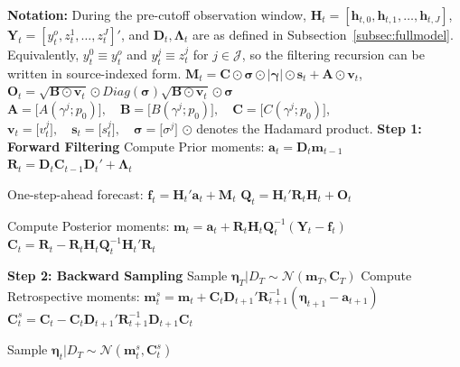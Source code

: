 \documentclass[APA,STIX1COL]{WileyNJD-v2}
\begin{document}
\begin{algorithm}
\caption{MCMC - Forward Filtering Backward Sampling (FFBS)}
\label{alg:Alg2}
\begin{algorithmic}

\State \textbf{Notation:}
\State  During the pre-cutoff observation window, \(\mathbf{H}_t = [\mathbf{h}_{t,0}, \mathbf{h}_{t,1}, \ldots, \mathbf{h}_{t,J}]\), \(\mathbf{Y}_t = [y_t^o, z_t^1, \ldots, z_t^J]'\), and \(\mathbf{D}_t, \boldsymbol{\Lambda}_t\) are as defined in Subsection~\ref{subsec:fullmodel}.
\State  Equivalently, \(y_t^0 \equiv y_t^o\) and \(y_t^j \equiv z_t^j\) for \(j\in\mathcal{J}\), so the filtering recursion can be written in source-indexed form.
\State $\mathbf{M}_t= \mathbf{C} \odot  \mathbf{\sigma} \odot | \mathbf{\gamma} | \odot \mathbf{s}_t + \mathbf{A} \odot \mathbf{v}_t$, \quad $\mathbf{O}_t= \sqrt{\mathbf{B} \odot \mathbf{v}_t} \odot Diag
(\mathbf{\sigma}) \sqrt{\mathbf{B} \odot \mathbf{v}_t} \odot \mathbf{\sigma}$
\State  \(
\mathbf{A} = \big[ A(\gamma^j;p_0)   \big], \quad \mathbf{B} = \big[  B(\gamma^j;p_0)  \big], \quad \mathbf{C} = \big[ C(\gamma^j;p_0)   \big] \), 
\State \( \mathbf{v}_t = \big[  v^j_t   \big], \quad  \mathbf{s}_t = \big[
s^j_t  \big] , \quad \mathbf{\sigma} = \big[ \sigma^j  \big]
\)
\State \(\odot\) denotes the Hadamard product.
\State \textbf{Step 1: Forward Filtering}
    \State Compute Prior moments:
    \State $\mathbf{a}_t = \mathbf{D}_t \mathbf{m}_{t-1}$
    \State $\mathbf{R}_t = \mathbf{D}_t \mathbf{C}_{t-1} \mathbf{D}_t' +  \boldsymbol{\Lambda}_t$

    \State One-step-ahead forecast:
    \State $\mathbf{f}_t = \mathbf{H}_t' \mathbf{a}_t + \mathbf{M}_t$
    \State $\mathbf{Q}_t = \mathbf{H}_t' \mathbf{R}_t \mathbf{H}_t + \mathbf{O}_t$

    \State Compute Posterior moments:
    \State $\mathbf{m}_t = \mathbf{a}_t + \mathbf{R}_t \mathbf{H}_t \mathbf{Q}_t^{-1}(\mathbf{Y}_t - \mathbf{f}_t)$
    \State $\mathbf{C}_t = \mathbf{R}_t - \mathbf{R}_t \mathbf{H}_t \mathbf{Q}_t^{-1} \mathbf{H}_t' \mathbf{R}_t$
\EndFor

\State \textbf{Step 2: Backward Sampling}
        \State Sample $\boldsymbol{\eta}_T | D_T \sim \mathcal{N}(\mathbf{m}_T, \mathbf{C}_T)$
    \Else
        \State Compute Retrospective moments:
        \State $\mathbf{m}_t^s = \mathbf{m}_t + \mathbf{C}_t \mathbf{D}_{t+1}' \mathbf{R}_{t+1}^{-1} (\boldsymbol{\eta}_{t+1} - \mathbf{a}_{t+1})$
        \State $\mathbf{C}_t^s = \mathbf{C}_t - \mathbf{C}_t \mathbf{D}_{t+1}' \mathbf{R}_{t+1}^{-1} \mathbf{D}_{t+1} \mathbf{C}_t$

        \State Sample $\boldsymbol{\eta}_t | D_T \sim \mathcal{N}(\mathbf{m}_t^s, \mathbf{C}_t^s)$
    \EndIf
\EndFor

\end{algorithmic}
\end{algorithm}
\end{document}
